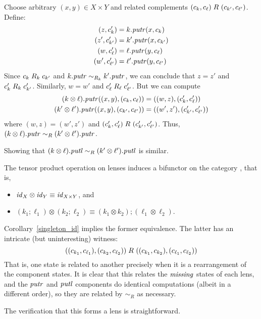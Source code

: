 \begin{defn}[$R$-similarity]
\begin{theorem}
\begin{lemma}
\begin{theorem}[No products]
\begin{lenseqv}
Choose arbitrary $(x,y) \in X \times Y$ and related complements
$(c_k,c_\ell) \mathrel{R_{}} (c_{k'},c_{\ell'})$. Define:
\begin{align*}
    (z,c_k')        &= k.\mathit{putr}(x,c_k) \\
    (z',c_{k'}')    &= k'.\mathit{putr}(x,c_{k'}) \\
    (w,c_\ell')     &= \ell.\mathit{putr}(y,c_\ell) \\
    (w',c_{\ell'}') &= \ell'.\mathit{putr}(y,c_{\ell'})
\end{align*}
Since $c_k \mathrel{R_{k}} c_{k'}$ and $k.\mathit{putr} \sim_{R_k} k'.\mathit{putr}$, we can
conclude that $z=z'$ and $c_k' \mathrel{R_{k}} c_{k'}'$. Similarly, $w = w'$
and $c_\ell' \mathrel{R_{\ell}} c_{\ell'}'$. But we can compute
\begin{align*}
    (k \otimes \ell).\mathit{putr}((x,y),(c_k,c_\ell)) &= ((w,z),(c_k',c_\ell')) \\
    (k' \otimes \ell').\mathit{putr}((x,y),(c_{k'},c_{\ell'})) &=
    ((w',z'),(c_{k'}',c_{\ell'}'))
\end{align*}
where $(w,z)=(w',z')$ and $(c_k',c_\ell') \mathrel{R_{}} (c_{k'}',c_{\ell'}')$. Thus,
$(k \otimes \ell).\mathit{putr} \sim_R (k' \otimes \ell').\mathit{putr}$.

Showing that $(k \otimes \ell).\mathit{putl} \sim_R (k' \otimes \ell').\mathit{putl}$ is
similar.
\end{lenseqv}

\begin{lemma}
The tensor product operation on lenses induces a bifunctor on the category
\LENS{}, that is,
\begin{itemize}
    \item[] $\mathit{id}_X \otimes \mathit{id}_Y \equiv \mathit{id}_{X \times Y}$, and
    \item[] $(k_1 ; \ell_1) \otimes (k_2 ; \ell_2) \equiv (k_1 \otimes k_2)
; (\ell_1 \otimes \ell_2)$.
\end{itemize}
\end{lemma}

\begin{functoriality}
Corollary~\ref{singleton_id} implies the former equivalence. The latter has
an intricate (but uninteresting) witness:
\[((c_{k_1},c_{\ell_1}),(c_{k_2},c_{\ell_2})) \mathrel{R_{}}
((c_{k_1},c_{k_2}),(c_{\ell_1},c_{\ell_2}))\]
That is, one state is related to another precisely when it is a
rearrangement of the component states. It is clear that this relates the
$\mathit{missing}$ states of each lens, and the $\mathit{putr}$ and $\mathit{putl}$ components do
identical computations (albeit in a different order), so they are related by
$\sim_R$ as necessary.
\end{functoriality}
\else
The verification that this forms a lens is straightforward.
\fi


\end{theorem}
\end{lemma}
\end{theorem}
\end{defn}

